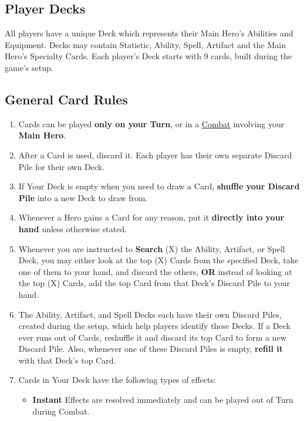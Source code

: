 
\begin{multicols*}{2}

\subsection*{\hypertarget{Playerdecks}{Player Decks}}
All players have a unique Deck which represents their Main Hero's Abilities and Equipment.
Decks may contain Statistic, Ability, Spell, Artifact and the Main Hero's Specialty Cards.
Each player's Deck starts with 9 cards, built during the game's setup.

\subsection*{General Card Rules}
\begin{enumerate}
  \item Cards can be played \textbf{only on your Turn}, or in a \hyperlink{Combat}{Combat} involving your \textbf{Main Hero}.
  \item After a Card is used, discard it.
    Each player has their own separate Discard Pile for their own Deck.
  \item If Your Deck is empty when you need to draw a Card, \textbf{shuffle your Discard Pile} into a new Deck to draw from.
  \item Whenever a Hero gains a Card for any reason, put it \textbf{directly into your hand} unless otherwise stated.
  \item Whenever you are instructed to \textbf{Search} (X) the Ability, Artifact, or Spell Deck, you may either look at the top (X) Cards from the specified Deck, take one of them to your hand, and discard the others, \textbf{OR} instead of looking at the top (X) Cards, add the top Card from that Deck's Discard Pile to your hand.
  \item The Ability, Artifact, and Spell Decks each have their own Discard Piles, created during the setup, which help players identify these Decks.
    If a Deck ever runs out of Cards, reshuffle it and discard its top Card to form a new Discard Pile.
    Also, whenever one of these Discard Piles is empty, \textbf{refill it} with that Deck's top Card.
  \item Cards in Your Deck have the following types of effects:
  \begin{itemize}
    \item \textbf{Instant}  Effects are resolved immediately and can be played out of Turn during Combat.

\end{itemize}
\end{enumerate}
\end{multicols*}

